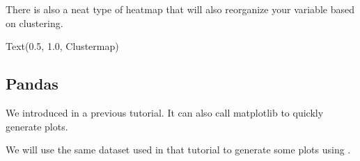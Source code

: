 \documentclass[letterpaper,10pt,english]{sphinxmanual}
\begin{document}
\noindent{}

There is also a neat type of heatmap that will also reorganize your variable based on clustering.

\begin{sphinxVerbatim}[commandchars=\\\{\}]
     
 
\end{sphinxVerbatim}

\begin{sphinxVerbatim}[commandchars=\\\{\}]
Text(0.5, 1.0, \PYGZsq{}Clustermap\PYGZsq{})
\end{sphinxVerbatim}

\noindent{}


\subsection{Pandas}
\label{\detokenize{content/Introduction_to_Plotting:pandas}}
We introduced  in a previous tutorial. It can also call matplotlib to quickly generate plots.

We will use the same dataset used in that tutorial to generate some plots using .

\begin{sphinxVerbatim}[commandchars=\\\{\}]
      
  
  \PYG{p}{[}\PYG{p}{[}\PYG{p}{]}\PYG{p}{]}
\end{sphinxVerbatim}
\end{document}
